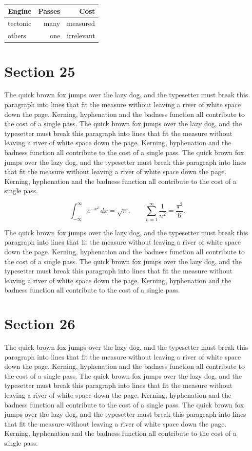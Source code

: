 \documentclass{article}
\begin{document}
\begin{center}
\begin{tabular}{lrr}
\toprule
Engine & Passes & Cost \\
\midrule
tectonic & many & measured \\
others & one & irrelevant \\
\bottomrule
\end{tabular}
\end{center}

\section{Section 25}
The quick brown fox jumps over the lazy dog, and the typesetter must break this paragraph into lines that fit the measure without leaving a river of white space down the page. Kerning, hyphenation and the badness function all contribute to the cost of a single pass. The quick brown fox jumps over the lazy dog, and the typesetter must break this paragraph into lines that fit the measure without leaving a river of white space down the page. Kerning, hyphenation and the badness function all contribute to the cost of a single pass. The quick brown fox jumps over the lazy dog, and the typesetter must break this paragraph into lines that fit the measure without leaving a river of white space down the page. Kerning, hyphenation and the badness function all contribute to the cost of a single pass. 

\begin{equation}
\int_{-\infty}^{\infty} e^{-x^{2}}\,dx = \sqrt{\pi}, \qquad
\sum_{n=1}^{\infty} \frac{1}{n^{2}} = \frac{\pi^{2}}{6}.
\end{equation}

The quick brown fox jumps over the lazy dog, and the typesetter must break this paragraph into lines that fit the measure without leaving a river of white space down the page. Kerning, hyphenation and the badness function all contribute to the cost of a single pass. The quick brown fox jumps over the lazy dog, and the typesetter must break this paragraph into lines that fit the measure without leaving a river of white space down the page. Kerning, hyphenation and the badness function all contribute to the cost of a single pass. 
\section{Section 26}
The quick brown fox jumps over the lazy dog, and the typesetter must break this paragraph into lines that fit the measure without leaving a river of white space down the page. Kerning, hyphenation and the badness function all contribute to the cost of a single pass. The quick brown fox jumps over the lazy dog, and the typesetter must break this paragraph into lines that fit the measure without leaving a river of white space down the page. Kerning, hyphenation and the badness function all contribute to the cost of a single pass. The quick brown fox jumps over the lazy dog, and the typesetter must break this paragraph into lines that fit the measure without leaving a river of white space down the page. Kerning, hyphenation and the badness function all contribute to the cost of a single pass. 
\end{document}
